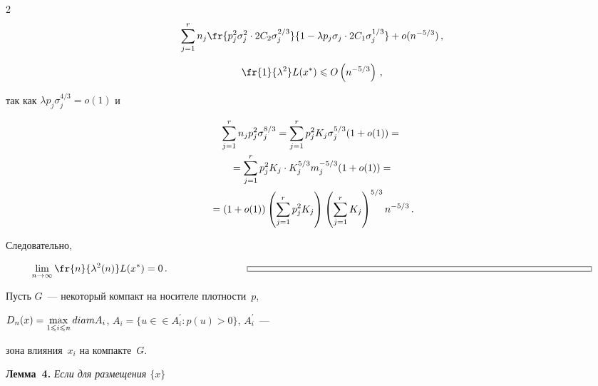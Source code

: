 \begin{multicols}{2}
\begin{multline*}
\suml{j=1}{r}n_j \fr{p_j^2 \sigma_j^2 \cdot


2 C_2 \sigma_j^{2/3}}{1-\lambda p_j \sigma_j \cdot 2 C_1 \sigma_j^{1/3}} + o(n^{-5/3})\,,


\end{multline*}


$$


\fr{1}{\lambda^2}L(x^*)\leqslant O\left(n^{-5/3}\right)\,,


$$


так как $\lambda p_j \sigma_j^{4/3}=o(1)$ и


\begin{multline*}


\suml{j=1}{r}n_j p_j^2 \sigma_j^{8/3}=\suml{j=1}{r}p_j^2 K_j \sigma_j^{5/3}(1+o(1))={}\\


{}=\suml{j=1}{r}p_j^2 K_j \cdot


K_j^{5/3} m_j^{-5/3}(1+o(1))={}\\


{}


=(1+o(1))\left(\suml{j=1}{r}p_j^2 K_j\right)\left(\suml{j=1}{r} K_j\right)^{5/3}


n^{-5/3}\,.


\end{multline*}


Следовательно,


$$


\limn\fr{n}{\lambda^2(n)}L(x^*)=0\,. \qquad\qquad\qquad\qquad  \sqq


$$





\smallskip








Пусть $G$~--- некоторый компакт на носителе плотности~$p$,


$D_n(x)=\max\limits_{1\leqslant i\leqslant n}diam A_i$, $A_i=\{u\in$\linebreak $\in A_i^{'} : p(u)>0 \}$, $A_i^{'}$~--- 


зона влияния~$x_i$ на компакте~$G$.





\medskip





\noindent


\textbf{Лемма~4.} \textit{Если для размещения $\{x\}$}



\end{multicols}
